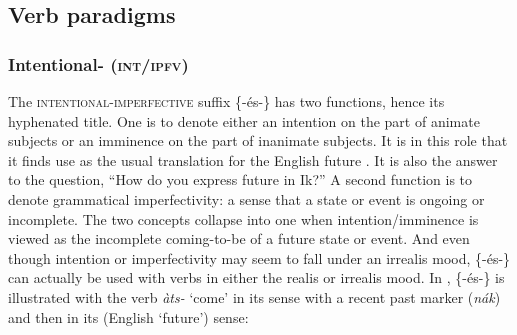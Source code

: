 \newpage 
\subsection{Verb paradigms}\label{sec:8.10}
\subsubsection{Intentional- (\textsc{int/ipfv})}\label{sec:8.10.1}

The \textsc{intentional-imperfective}  suffix \{-és-\} has two functions, hence its hyphenated title. One is to denote either an intention on the part of animate subjects or an imminence on the part of inanimate subjects. It is in this role that it finds use as the usual translation for the English future . It is also the answer to the question, “How do you express future  in Ik?” A second function is to denote grammatical imperfectivity: a sense that a state or event is ongoing or incomplete. The two concepts collapse into one when intention/imminence is viewed as the incomplete coming-to-be of a future state or event.  And even though intention or imperfectivity may seem to fall under an irrealis mood, \{-és-\} can actually be used with verbs in either the realis or irrealis mood. In , \{-és-\} is illustrated with the verb \textit{àts-} ‘come’ in its  sense with a recent past  marker (\textit{nák\ᵃ}) and then in its  (English `future') sense:


